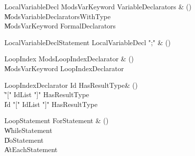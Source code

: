 \begin{bbgrammar}

LocalVariableDecl \label{prod:LocalVariableDecl}  \: Mods\opt VarKeyword VariableDeclarators & () \\

    \| Mods\opt VariableDeclaratorsWithType \\
    \| Mods\opt VarKeyword FormalDeclarators \\

\end{bbgrammar}

\begin{bbgrammar}

LocalVariableDeclStatement \label{prod:LocalVariableDeclStatement}  \: LocalVariableDecl \xcd";" & () \\


\end{bbgrammar}

\begin{bbgrammar}

LoopIndex \label{prod:LoopIndex}  \: Mods\opt LoopIndexDeclarator & () \\

    \| Mods\opt VarKeyword LoopIndexDeclarator \\

\end{bbgrammar}

\begin{bbgrammar}

LoopIndexDeclarator \label{prod:LoopIndexDeclarator}  \: Id HasResultType\opt & () \\

    \| \xcd"[" IdList \xcd"]" HasResultType\opt \\
    \| Id \xcd"[" IdList \xcd"]" HasResultType\opt \\

\end{bbgrammar}

\begin{bbgrammar}

LoopStatement \label{prod:LoopStatement}  \: ForStatement & () \\

    \| WhileStatement \\
    \| DoStatement \\
    \| AtEachStatement \\

\end{bbgrammar}


